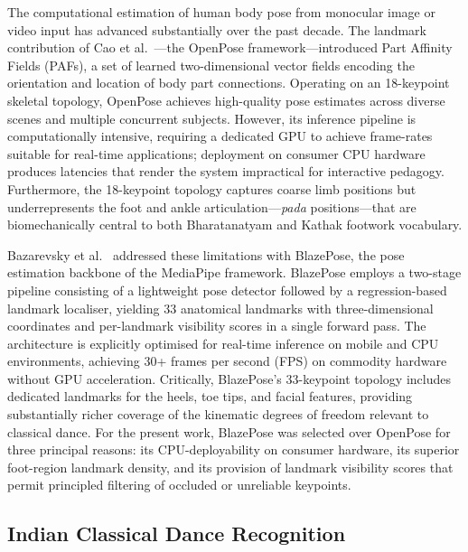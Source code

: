 \documentclass[journal]{IEEEtran}
\begin{document}
The computational estimation of human body pose from monocular image or
video input has advanced substantially over the past decade. The
landmark contribution of Cao et al.~\cite{openpose2017}—the OpenPose
framework—introduced Part Affinity Fields (PAFs), a set of learned
two-dimensional vector fields encoding the orientation and location of
body part connections. Operating on an 18-keypoint skeletal topology,
OpenPose achieves high-quality pose estimates across diverse scenes and
multiple concurrent subjects. However, its inference pipeline is
computationally intensive, requiring a dedicated GPU to achieve
frame-rates suitable for real-time applications; deployment on
consumer CPU hardware produces latencies that render the system
impractical for interactive pedagogy. Furthermore, the 18-keypoint
topology captures coarse limb positions but underrepresents the foot
and ankle articulation—\textit{pada} positions—that are biomechanically
central to both Bharatanatyam and Kathak footwork vocabulary.

Bazarevsky et al.~\cite{blazepose2020} addressed these limitations
with BlazePose, the pose estimation backbone of the MediaPipe
framework. BlazePose employs a two-stage pipeline consisting of a
lightweight pose detector followed by a regression-based landmark
localiser, yielding 33 anatomical landmarks with three-dimensional
coordinates and per-landmark visibility scores in a single
forward pass. The architecture is explicitly optimised for real-time
inference on mobile and CPU environments, achieving 30+ frames per
second (FPS) on commodity hardware without GPU acceleration.
Critically, BlazePose's 33-keypoint topology includes dedicated
landmarks for the heels, toe tips, and facial features, providing
substantially richer coverage of the kinematic degrees of freedom
relevant to classical dance. For the present work, BlazePose was
selected over OpenPose for three principal reasons: its
CPU-deployability on consumer hardware, its superior foot-region
landmark density, and its provision of landmark visibility scores
that permit principled filtering of occluded or unreliable keypoints.

\subsection{Indian Classical Dance Recognition}
\end{document}
